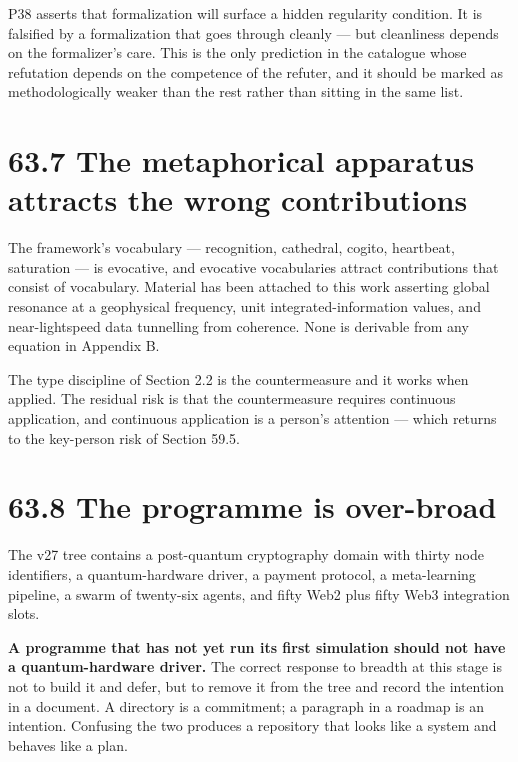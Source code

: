 \documentclass[
  11pt]{report}
\begin{document}
P38 asserts that formalization will surface a hidden regularity
condition. It is falsified by a formalization that goes through cleanly
--- but cleanliness depends on the formalizer's care. This is the only
prediction in the catalogue whose refutation depends on the competence
of the refuter, and it should be marked as methodologically weaker than
the rest rather than sitting in the same list.

\hypertarget{the-metaphorical-apparatus-attracts-the-wrong-contributions}{%
\section{63.7 The metaphorical apparatus attracts the wrong
contributions}\label{the-metaphorical-apparatus-attracts-the-wrong-contributions}}

The framework's vocabulary --- recognition, cathedral, cogito,
heartbeat, saturation --- is evocative, and evocative vocabularies
attract contributions that consist of vocabulary. Material has been
attached to this work asserting global resonance at a geophysical
frequency, unit integrated-information values, and near-lightspeed data
tunnelling from coherence. None is derivable from any equation in
Appendix B.

The type discipline of Section 2.2 is the countermeasure and it works
when applied. The residual risk is that the countermeasure requires
continuous application, and continuous application is a person's
attention --- which returns to the key-person risk of Section 59.5.

\hypertarget{the-programme-is-over-broad}{%
\section{63.8 The programme is
over-broad}\label{the-programme-is-over-broad}}

The v27 tree contains a post-quantum cryptography domain with thirty
node identifiers, a quantum-hardware driver, a payment protocol, a
meta-learning pipeline, a swarm of twenty-six agents, and fifty Web2
plus fifty Web3 integration slots.

\textbf{A programme that has not yet run its first simulation should not
have a quantum-hardware driver.} The correct response to breadth at this
stage is not to build it and defer, but to remove it from the tree and
record the intention in a document. A directory is a commitment; a
paragraph in a roadmap is an intention. Confusing the two produces a
repository that looks like a system and behaves like a plan.
\end{document}
